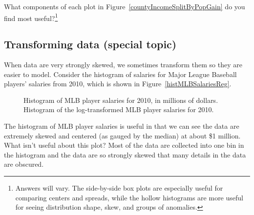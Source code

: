 \begin{exercise}
What components of each plot in Figure~\ref{countyIncomeSplitByPopGain} do you find most useful?\footnote{Answers will vary. The side-by-side box plots are especially useful for comparing centers and spreads, while the hollow histograms are more useful for seeing distribution shape, skew, and groups of anomalies.}
\end{exercise}



\subsection{Transforming data (special topic)}
\label{transformingDataSubsection}

When data are very strongly skewed, we sometimes transform them so they are easier to model. Consider the histogram of salaries for Major League Baseball players' salaries from 2010, which is shown in Figure~\ref{histMLBSalariesReg}.

\begin{figure}[ht]
\centering
{}
\caption{ Histogram of MLB player salaries for 2010, in millions of dollars.  Histogram of the log-transformed MLB player salaries for 2010.}
\label{histMLBSalaries}
\end{figure}

\begin{example}{The histogram of MLB player salaries is useful in that we can see the data are extremely skewed and centered (as gauged by the median) at about \$1 million. What isn't useful about this plot?}
Most of the data are collected into one bin in the histogram and the data are so strongly skewed that many details in the data are obscured.
\end{example}

